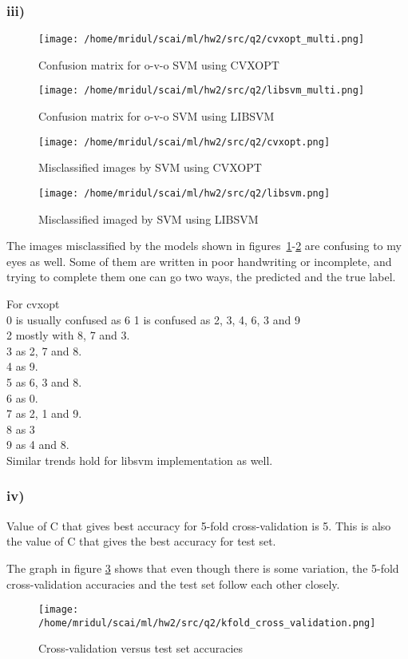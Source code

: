 \documentclass[11pt]{article}
\begin{document}
\subsubsection{iii)}
\label{sec:org9f2c6a0}
\begin{figure}[!htp]
\centering
\texttt{[image: /home/mridul/scai/ml/hw2/src/q2/cvxopt\_multi.png]}
\caption{Confusion matrix for o-v-o SVM using CVXOPT}
\end{figure}
\begin{figure}[!htp]
\centering
\texttt{[image: /home/mridul/scai/ml/hw2/src/q2/libsvm\_multi.png]}
\caption{Confusion matrix for o-v-o SVM using LIBSVM}
\end{figure}
\begin{figure}[!htp]
\centering
\texttt{[image: /home/mridul/scai/ml/hw2/src/q2/cvxopt.png]}
	\caption{Misclassified images by SVM using CVXOPT\label{mis}}
\end{figure}
\begin{figure}[!htp]
\centering
\texttt{[image: /home/mridul/scai/ml/hw2/src/q2/libsvm.png]}
	\caption{Misclassified imaged by SVM using LIBSVM\label{mis1}}
\end{figure}
The images misclassified by the models shown in figures~\ref{mis}-\ref{mis1} are confusing to my eyes as
well. Some of them are written in poor handwriting or incomplete, and
trying to complete them one can go two ways, the predicted and the
true label.
\par
For cvxopt\\
0 is usually confused as 6
1 is confused as 2, 3, 4, 6, 3 and 9\\
2 mostly with 8, 7 and 3.\\
3 as 2, 7 and 8.\\
4 as 9.\\
5 as 6, 3 and 8.\\
6 as 0.\\
7 as 2, 1 and 9.\\
8 as 3\\
9 as 4 and 8.\\
Similar trends hold for libsvm implementation as well.

\subsubsection{iv)}
\label{sec:orge40a797}
Value of C that gives best accuracy for 5-fold cross-validation
is 5. This is also the value of C that gives the best accuracy for
test set.\par
The graph in figure \ref{kfold} shows that even though there is some variation, the 5-fold
cross-validation accuracies and the test set follow each other closely.
\begin{figure}[!htp]
\centering
\texttt{[image: /home/mridul/scai/ml/hw2/src/q2/kfold\_cross\_validation.png]}
	\caption{Cross-validation versus test set accuracies\label{kfold}}
\end{figure}
\end{document}
